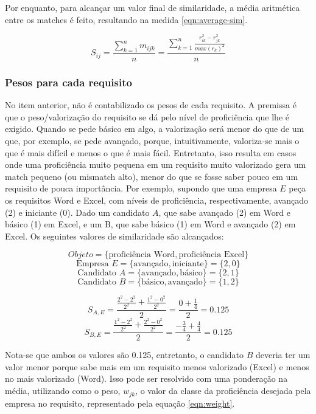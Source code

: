 \documentclass[preprint,12pt]{elsarticle}
\begin{document}
Por enquanto, para alcançar um valor final de similaridade, a média aritmética entre os matches é feito, resultando na medida \ref{eqn:average-sim}.

\begin{equation}
\label{eqn:average-sim}
S_{ij} =  \frac{\sum_{k=1}^n m_{ijk}}
              {n} = 
          \frac{\sum_{k=1}^n \frac{r_{ik}^2 - r_{jk}^2}{max(r_k)^2}}
              {n}
\end{equation}

\subsubsection{Pesos para cada requisito}
\label{sssec:weights}

No item anterior, não é contabilizado os pesos de cada requisito. A premissa é que o peso/valorização do requisito se dá pelo nível de proficiência que lhe é exigido. Quando se pede básico em algo, a valorização será menor do que de um que, por exemplo, se pede avançado, porque, intuitivamente, valoriza-se mais o que é mais difícil e menos o que é mais fácil. Entretanto, isso resulta em casos onde uma proficiência muito pequena em um requisito muito valorizado gera um match pequeno (ou mismatch alto), menor do que se fosse saber pouco em um requisito de pouca importância. Por exemplo, supondo que uma empresa $E$ peça os requisitos Word e Excel, com níveis de proficiência, respectivamente, avançado (2) e iniciante (0). Dado um candidato $A$, que sabe avançado (2) em Word e básico (1) em Excel, e um B, que sabe básico (1) em Word e avançado (2) em Excel. Os seguintes valores de similaridade são alcançados:

$$ Objeto = \{ \text{proficiência Word}, \text{proficiência Excel} \} $$
$$ \text{Empresa } E = \{ \text{avançado}, \text{iniciante} \} = \{ 2, 0 \} $$
$$ \text{Candidato } A = \{ \text{avançado}, \text{básico} \} = \{ 2, 1 \} $$
$$ \text{Candidato } B = \{ \text{básico}, \text{avançado} \} = \{ 1, 2 \} $$

$$ S_{A,E} = \frac{\tfrac{2^2 - 2^2}{2^2} + \tfrac{1^2 - 0^2}{2^2}}{2} = \frac{0 + \tfrac{1}{4}}{2} =  0.125 $$
$$ S_{B,E} = \frac{\tfrac{1^2 - 2^2}{2^2} + \tfrac{2^2 - 0^2}{2^2}}{2} = \frac{-\tfrac{3}{4} + \tfrac{4}{4}}{2} = 0.125 $$

Nota-se que ambos os valores são 0.125, entretanto, o candidato $B$ deveria ter um valor menor porque sabe mais em um requisito menos valorizado (Excel) e menos no mais valorizado (Word). Isso pode ser resolvido com uma ponderação na média, utilizando como o peso, $w_{jk}$, o valor da classe da proficiência desejada pela empresa no requisito, representado pela equação \ref{eqn:weight}. 
\end{document}
